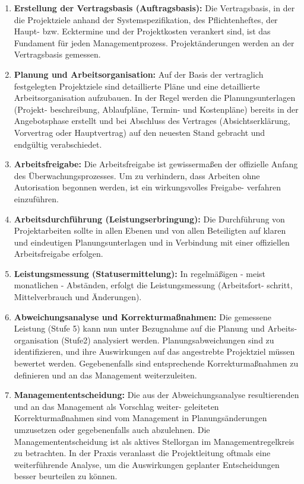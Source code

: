 \documentclass[11pt,a4paper]{article}
\begin{document}
\begin{enumerate}
	\item \textbf{Erstellung der Vertragsbasis (Auftragsbasis):} 
	Die Vertragsbasis, in der die Projektziele anhand der Systemspezifikation, des Pflichtenheftes,
der Haupt- bzw. Ecktermine und der Projektkosten verankert sind, ist das Fundament für jeden
Managementprozess. Projektänderungen werden an der Vertragsbasis gemessen.

	\item \textbf{Planung und Arbeitsorganisation:} Auf der Basis der vertraglich festgelegten Projektziele sind detaillierte Pläne und eine detaillierte
Arbeitsorganisation aufzubauen. In der Regel werden die Planungsunterlagen (Projekt-
beschreibung, Ablaufpläne, Termin- und Kostenpläne) bereits in der Angebotsphase erstellt und
bei Abschluss des Vertrages (Absichtserklärung, Vorvertrag oder Hauptvertrag) auf den
neuesten Stand gebracht und endgültig verabschiedet.

	\item \textbf{Arbeitsfreigabe:} Die Arbeitsfreigabe ist gewissermaßen der offizielle Anfang des Überwachungsprozesses. Um zu
verhindern, dass Arbeiten ohne Autorisation begonnen werden, ist ein wirkungsvolles Freigabe-
verfahren einzuführen.

	\item \textbf{Arbeitsdurchführung (Leistungserbringung):} Die Durchführung von Projektarbeiten sollte in allen Ebenen und von allen Beteiligten auf klaren
und eindeutigen Planungsunterlagen und in Verbindung mit einer offiziellen Arbeitsfreigabe
erfolgen.

	\item \textbf{Leistungsmessung (Statusermittelung):} In regelmäßigen - meist monatlichen - Abständen, erfolgt die Leistungsmessung (Arbeitsfort-
schritt, Mittelverbrauch und Änderungen).

	\item \textbf{Abweichungsanalyse und Korrekturmaßnahmen:} Die gemessene Leistung (Stufe 5) kann nun unter Bezugnahme auf die Planung und Arbeits-
organisation (Stufe2) analysiert werden. Planungsabweichungen sind zu identifizieren, und ihre
Auswirkungen auf das angestrebte Projektziel müssen bewertet werden. Gegebenenfalls sind
entsprechende Korrekturmaßnahmen zu definieren und an das Management weiterzuleiten.

	\item \textbf{Managemententscheidung:} Die aus der Abweichungsanalyse resultierenden und an das Management als Vorschlag weiter-
geleiteten Korrekturmaßnahmen sind vom Management in Planungsänderungen umzusetzen
oder gegebenenfalls auch abzulehnen. Die Managemententscheidung ist als aktives Stellorgan
im Managementregelkreis zu betrachten. In der Praxis veranlasst die Projektleitung oftmals eine
weiterführende Analyse, um die Auswirkungen geplanter Entscheidungen besser beurteilen zu
können.


\end{enumerate}
\end{document}
